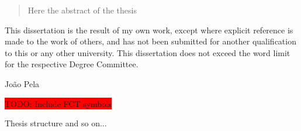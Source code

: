   


\begin{abstract}%
Here the abstract of the thesis
\end{abstract}


\begin{declaration}
  This dissertation is the result of my own work, except where explicit
  reference is made to the work of others, and has not been submitted
  for another qualification to this or any other university. This
  dissertation does not exceed the word limit for the respective Degree
  Committee.
  \vspace*{1cm}
  \begin{flushright}
    João Pela
  \end{flushright}
\end{declaration}


\begin{acknowledgements}


\colorbox{red}{TODO: Include FCT symbols}
\end{acknowledgements}



\begin{preface}
Thesis structure and so on...
\end{preface}

\dedication{To my grand mother}


\tableofcontents
\listoffigures
\listoftables

 

